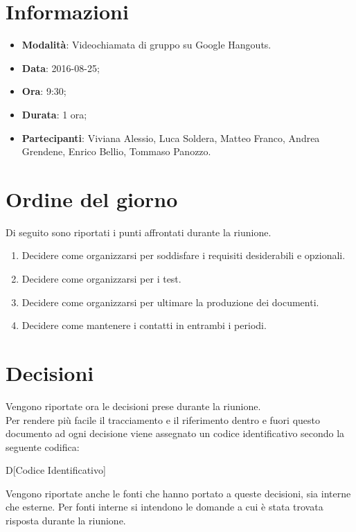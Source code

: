 \documentclass[a4paper,titlepage]{article}
\begin{document}
\maketitle

\begin{diario}
\end{diario}

\newpage
\tableofcontents

\newpage
\section{Informazioni}
\label{sec:Informazioni}

\begin{itemize}
 \item \textbf{Modalità}: Videochiamata di gruppo su Google Hangouts.
 \item \textbf{Data}: 2016-08-25;
 \item \textbf{Ora}: 9:30;
 \item \textbf{Durata}: 1 ora;
 \item \textbf{Partecipanti}: Viviana Alessio, Luca Soldera, Matteo Franco, Andrea Grendene, Enrico Bellio, Tommaso Panozzo.
\end{itemize}

\section{Ordine del giorno}
\label{sec:Ordine del giorno}
Di seguito sono riportati i punti affrontati durante la riunione.

\begin{enumerate}
	\item Decidere come organizzarsi per soddisfare i requisiti desiderabili e opzionali.
	\item Decidere come organizzarsi per i test.
	\item Decidere come organizzarsi per ultimare la produzione dei documenti.
	\item Decidere come mantenere i contatti in entrambi i periodi.
\end{enumerate}

\section{Decisioni}
Vengono riportate ora le decisioni prese durante la riunione. \\
Per rendere più facile il tracciamento e il riferimento dentro e fuori questo documento ad ogni decisione viene assegnato un codice identificativo secondo la seguente codifica:
\begin{center}
D[Codice Identificativo]
\end{center}
Vengono riportate anche le fonti che hanno portato a queste decisioni, sia interne che esterne. Per fonti interne si intendono le domande a cui è stata trovata risposta durante la riunione.
\end{document}
